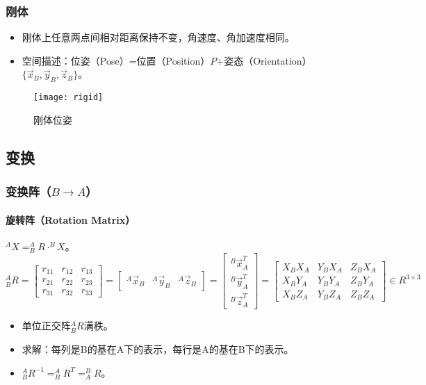 \documentclass[
12pt, %
a4paper, 
oneside, %
headinclude,footinclude, %
]{scrartcl}
\begin{document}
\subsubsection{刚体}
\begin{itemize}
\item 刚体上任意两点间相对距离保持不变，角速度、角加速度相同。
\item 空间描述：位姿（Pose）=位置（Position）$ P $+姿态（Orientation）$ \{\vec x_B, \vec y_B, \vec z_B\} $。
\end{itemize}

\begin{figure}[H]
\centering 
\texttt{[image: rigid]} 
\caption[刚体位姿]{刚体位姿}
\end{figure}
\subsection{变换}
\subsubsection{变换阵（$ B \to A $）}
\paragraph{旋转阵（Rotation Matrix）}
$ ^A X = ^A_B R \cdot ^B X $。
$$ 
^A_B R 
= \begin{bmatrix} r_{11} & r_{12} & r_{13} \\ r_{21} & r_{22} & r_{23} \\ r_{31} & r_{32} & r_{33} \end{bmatrix}
= \begin{bmatrix} ^A \vec x_B & ^A \vec y_B & ^A \vec z_B \end{bmatrix}
= \begin{bmatrix} ^B \vec x_A^T \\ ^B \vec y_A^T \\ ^B \vec z_A^T \end{bmatrix}
= \begin{bmatrix} X_BX_A & Y_BX_A & Z_BX_A \\ X_BY_A & Y_BY_A & Z_BY_A \\ X_BZ_A & Y_BZ_A & Z_BZ_A \end{bmatrix}
\in R^{3 \times 3}
$$
\begin{itemize}
\item 单位正交阵$ ^A_B R $满秩。
\item 求解：每列是B的基在A下的表示，每行是A的基在B下的表示。
\item $ ^A_B R^{-1} = ^A_B R^T = ^B_A R $。
\end{itemize}
\end{document}
